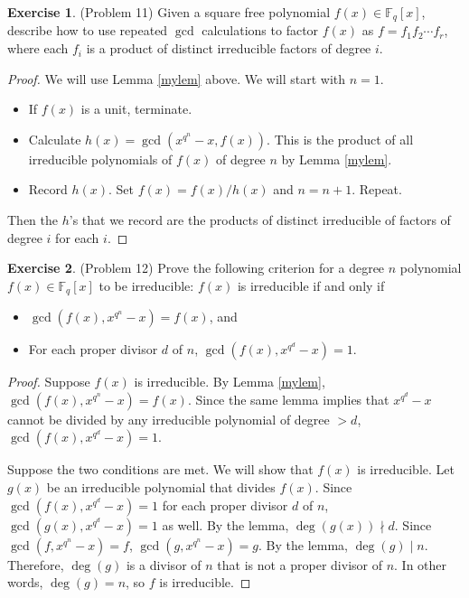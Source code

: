 \documentclass[12pt, psamsfonts]{amsart}
\theoremstyle{definition}
\newtheorem*{exer}{Exercise}
\theoremstyle{remark}
\numberwithin{equation}{section}
\begin{document}
\begin{exer}{(Problem 11)}
  Given a square free polynomial $f(x) \in \mathbb{F}_q[x]$, describe how to use repeated $\gcd$ calculations to factor $f(x)$ as $f = f_1f_2 \cdots f_r$, where each $f_i$ is a product of distinct irreducible factors of degree $i$.
\end{exer}

\begin{proof}
  We will use Lemma \ref{mylem} above.
  We will start with $n = 1$.
  \begin{itemize}
    \item
      If $f(x)$ is a unit, terminate.
    \item
      Calculate $h(x) = \gcd(x^{q^n} - x, f(x))$.
      This is the product of all irreducible polynomials of $f(x)$ of degree $n$ by Lemma \ref{mylem}.
    \item
      Record $h(x)$.
      Set $f(x) = f(x) / h(x)$ and $n = n + 1$.
      Repeat.
  \end{itemize}
  Then the $h$'s that we record are the products of distinct irreducible of factors of degree $i$ for each $i$.
\end{proof}

\begin{exer}{(Problem 12)}
  Prove the following criterion for a degree $n$ polynomial $f(x) \in \mathbb{F}_q[x]$ to be irreducible:
  $f(x)$ is irreducible if and only if
  \begin{itemize}
    \item
      $\gcd(f(x), x^{q^n} - x) = f(x)$, and
    \item
      For each proper divisor $d$ of $n$, $\gcd(f(x), x^{q^d} - x) = 1$.
  \end{itemize}
\end{exer}

\begin{proof}
  Suppose $f(x)$ is irreducible.
  By Lemma \ref{mylem}, $\gcd(f(x), x^{q^n} - x) = f(x)$.
  Since the same lemma implies that $x^{q^d} - x$ cannot be divided by any irreducible polynomial of degree $> d$, $\gcd(f(x), x^{q^d} - x) = 1$.

  Suppose the two conditions are met.
  We will show that $f(x)$ is irreducible.
  Let $g(x)$ be an irreducible polynomial that divides $f(x)$.
  Since $\gcd(f(x), x^{q^d} - x) = 1$ for each proper divisor $d$ of $n$, $\gcd(g(x), x^{q^d} - x) = 1$ as well.
  By the lemma, $\deg(g(x)) \nmid d$.
  Since $\gcd(f, x^{q^n} - x) = f$, $\gcd(g, x^{q^n} - x) = g$.
  By the lemma, $\deg(g) \mid n$.
  Therefore, $\deg(g)$ is a divisor of $n$ that is not a proper divisor of $n$.
  In other words, $\deg(g) = n$, so $f$ is irreducible.
\end{proof}
\end{document}

